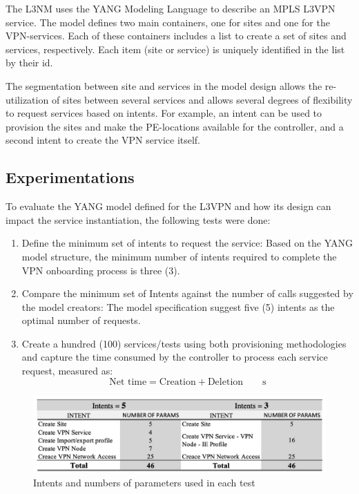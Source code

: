 \documentclass[conference]{IEEEtran}
\begin{document}
The L3NM uses the YANG Modeling Language to describe an MPLS L3VPN service. The model defines two main containers, one for sites and one for the VPN-services. Each of these containers includes a list to create a set of sites and services, respectively. Each item (site or service) is uniquely identified in the list by their id.

The segmentation between site and services in the model design allows the re-utilization of sites between several services and allows several degrees of flexibility to request services based on intents.  For example, an intent can be used to provision the sites and make the PE-locations available for the controller, and a second intent to create the VPN service itself.

\subsection{Experimentations}
To evaluate the YANG model defined for the L3VPN and how its design can impact the service instantiation, the following tests were done:
\begin{enumerate}
    \item Define the minimum set of intents to request the service: Based on the YANG model structure, the minimum number of intents required to complete the VPN onboarding process is three (3).
    \item Compare the minimum set of Intents against the number of calls suggested by the model creators: The model specification suggest five (5) intents as the optimal number of requests. 
    \item Create a hundred (100) services/tests using both provisioning methodologies and capture the time consumed by the controller to process each service request, measured as:
    \begin{equation}
         \si{\textrm{Net time}= \textrm{Creation} + \textrm{Deletion}\qquad \second}
    \end{equation}
\end{enumerate}

\begin{figure}
	\centering
		\includegraphics[width=\linewidth]{figure41.png}
	\caption{Intents and numbers of parameters used in each test}
	\label{FIG:4}
\end{figure}
\end{document}
